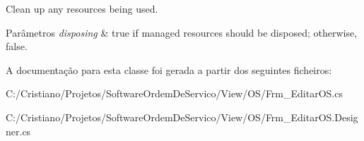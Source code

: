 Clean up any resources being used. 


\begin{DoxyParams}{Parâmetros}
{\em disposing} & true if managed resources should be disposed; otherwise, false.\\
\hline
\end{DoxyParams}


A documentação para esta classe foi gerada a partir dos seguintes ficheiros\+:\begin{DoxyCompactItemize}
\item 
C\+:/\+Cristiano/\+Projetos/\+Software\+Ordem\+De\+Servico/\+View/\+O\+S/Frm\+\_\+\+Editar\+O\+S.\+cs\item 
C\+:/\+Cristiano/\+Projetos/\+Software\+Ordem\+De\+Servico/\+View/\+O\+S/Frm\+\_\+\+Editar\+O\+S.\+Designer.\+cs\end{DoxyCompactItemize}
